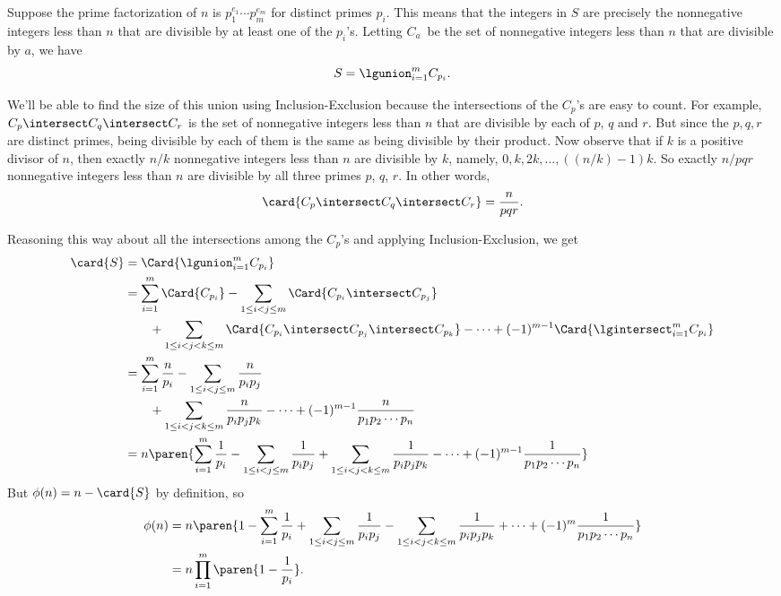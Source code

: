 Suppose the prime factorization of $n$ is $p_1^{e_1}\cdots p_m^{e_m}$
for distinct primes $p_i$.  This means that the integers in $S$ are
precisely the nonnegative integers less than $n$ that are divisible by at
least one of the $p_i$'s.  Letting $C_a$~be the set of nonnegative
integers less than $n$ that are divisible by $a$, we have
\[
S = \lgunion_{i=1}^m C_{p_i}.
\]

We'll be able to find the size of this union using Inclusion-Exclusion
because the intersections of the $C_p$'s are easy to count.  For example,
$C_p \intersect C_q \intersect C_r$ is the set of nonnegative integers less
than $n$ that are divisible by each of $p$, $q$ and $r$.  But since
the $p,q,r$ are distinct primes, being divisible by each of them is
the same as being divisible by their product.  Now observe that if $k$ is
a positive divisor of $n$, then exactly $n/k$ nonnegative integers less
than $n$ are divisible by $k$, namely, $0,k,2k,\dots,((n/k)-1)k$.  So
exactly $n/pqr$ nonnegative integers less than $n$ are divisible by
all three primes $p$, $q$, $r$.  In other words,
\[
\card{C_p \intersect C_q \intersect C_r} = \frac{n}{pqr}.
\]

Reasoning this way about all the intersections among the $C_p$'s and
applying Inclusion-Exclusion, we get
\begin{align*}
\card{S}
  & = \Card{\lgunion_{i=1}^m C_{p_i}}\\
  & = \sum_{i=1}^m \Card{C_{p_i}} - \sum_{1\leq i < j \leq m} \Card{C_{p_i} \intersect C_{p_j}}\\
  &\qquad  + \sum_{1\leq i < j < k \leq m} \Card{C_{p_i} \intersect C_{p_j} \intersect C_{p_k}} -
       \cdots + (-1)^{m-1} \Card{\lgintersect_{i=1}^m C_{p_i}}\\
  & = \sum_{i=1}^m \frac{n}{p_i} -
      \sum_{1\leq i < j \leq m} \frac{n}{p_ip_j}\\
  &\qquad  + \sum_{1\leq i < j < k \leq m} \frac{n}{p_ip_jp_k} -
       \cdots + (-1)^{m-1} \frac{n}{p_1p_2\cdots p_n}\\
  & = n\paren{\sum_{i=1}^m \frac{1}{p_i} -
      \sum_{1\leq i < j \leq m} \frac{1}{p_ip_j}
       + \sum_{1\leq i < j < k \leq m} \frac{1}{p_ip_jp_k} - \cdots
        + (-1)^{m-1} \frac{1}{p_1p_2\cdots p_n}}
\end{align*}
But $\phi(n)=n-\card{S}$ by definition, so
\begin{align}
  \phi(n) & = n\paren{1 - \sum_{i=1}^m \frac{1}{p_i} +  \sum_{1\leq i < j \leq m} \frac{1}{p_ip_j}
    - \sum_{1\leq i < j < k \leq m} \frac{1}{p_ip_jp_k} + \cdots
    + (-1)^m\frac{1}{p_1p_2\cdots p_n}}\notag\\
          &  = n \prod_{i=1}^m \paren{1 - \frac{1}{p_i}}.\label{inex-phi}
\end{align}

